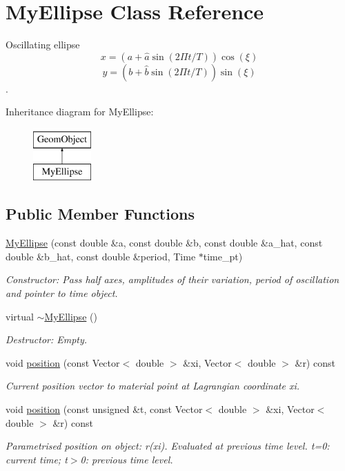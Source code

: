 \hypertarget{classMyEllipse}{}\section{My\+Ellipse Class Reference}
\label{classMyEllipse}


Oscillating ellipse \[ x = (a + \widehat{a} \sin(2\Pi t/T)) \cos(\xi) \] \[ y = (b + \widehat{b} \sin(2\Pi t/T)) \sin(\xi) \].  


Inheritance diagram for My\+Ellipse\+:\begin{figure}[H]
\begin{center}
\leavevmode
\includegraphics[height=2.000000cm]{classMyEllipse}
\end{center}
\end{figure}
\subsection*{Public Member Functions}
\begin{DoxyCompactItemize}
\item 
\hyperlink{classMyEllipse_aaa00984813af171e611e420eb3433653}{My\+Ellipse} (const double \&a, const double \&b, const double \&a\+\_\+hat, const double \&b\+\_\+hat, const double \&period, Time $\ast$time\+\_\+pt)
\begin{DoxyCompactList}\small\item\em Constructor\+: Pass half axes, amplitudes of their variation, period of oscillation and pointer to time object. \end{DoxyCompactList}\item 
virtual \hyperlink{classMyEllipse_ac2f2d3fb269c57fb26b4db6d9a0c7c05}{$\sim$\+My\+Ellipse} ()
\begin{DoxyCompactList}\small\item\em Destructor\+: Empty. \end{DoxyCompactList}\item 
void \hyperlink{classMyEllipse_a7b139a2f4564005773c83325f2414e3e}{position} (const Vector$<$ double $>$ \&xi, Vector$<$ double $>$ \&r) const
\begin{DoxyCompactList}\small\item\em Current position vector to material point at Lagrangian coordinate xi. \end{DoxyCompactList}\item 
void \hyperlink{classMyEllipse_a93f75bf33969037e35d779738a8493f5}{position} (const unsigned \&t, const Vector$<$ double $>$ \&xi, Vector$<$ double $>$ \&r) const
\begin{DoxyCompactList}\small\item\em Parametrised position on object\+: r(xi). Evaluated at previous time level. t=0\+: current time; t$>$0\+: previous time level. \end{DoxyCompactList}\end{DoxyCompactItemize}

